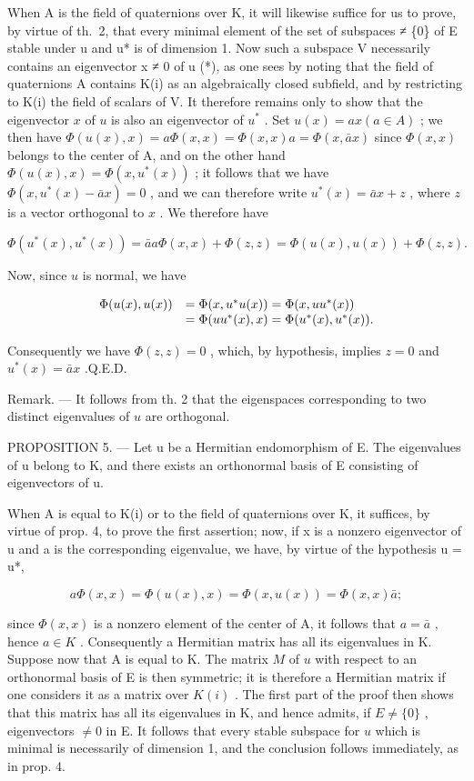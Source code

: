 When A is the field of quaternions over K, it will likewise suffice for us to prove, by virtue of th.~2, that every minimal element of the set of subspaces ≠ \{0\} of E stable under u and u* is of dimension 1. Now such a subspace V necessarily contains an eigenvector x ≠ 0 of u (*), as one sees by noting that the field of quaternions A contains K(i) as an algebraically closed subfield, and by restricting to K(i) the field of scalars of V. It therefore remains only to show that the eigenvector \(x\) of \(u\) is also an eigenvector of \(u^{*}\) . Set \(u(x) = ax (a \in A)\) ; we then have \(\Phi(u(x), x) = a\Phi(x, x) = \Phi(x, x)a = \Phi(x, \bar{a}x)\) since \(\Phi(x, x)\) belongs to the center of A, and on the other hand \(\Phi(u(x), x) = \Phi(x, u^*(x))\) ; it follows that we have \(\Phi(x, u^*(x) - \bar{a}x) = 0\) , and we can therefore write \(u^*(x) = \bar{a}x + z\) , where \(z\) is a vector orthogonal to \(x\) . We therefore have

\[
\Phi (u ^ {*} (x), u ^ {*} (x)) = \bar {a} a \Phi (x, x) + \Phi (z, z) = \Phi (u (x), u (x)) + \Phi (z, z).
\]

Now, since \(u\) is normal, we have

\[
\begin{array}{r l} \Phi (u (x), u (x)) & = \Phi (x, u ^ {*} u (x)) = \Phi (x, u u ^ {*} (x)) \\ & = \Phi (u u ^ {*} (x), x) = \Phi (u ^ {*} (x), u ^ {*} (x)). \end{array}
\]

Consequently we have \(\Phi(z, z) = 0\) , which, by hypothesis, implies \(z = 0\) and \(u^{*}(x) = \bar{a}x\) .Q.E.D.

Remark. --- It follows from th. 2 that the eigenspaces corresponding to two distinct eigenvalues of \(u\) are orthogonal.

PROPOSITION 5. --- Let u be a Hermitian endomorphism of E. The eigenvalues of u belong to K, and there exists an orthonormal basis of E consisting of eigenvectors of u.

When A is equal to K(i) or to the field of quaternions over K, it suffices, by virtue of prop. 4, to prove the first assertion; now, if x is a nonzero eigenvector of u and a is the corresponding eigenvalue, we have, by virtue of the hypothesis u = u*,

\[
a \Phi (x, x) = \Phi (u (x), x) = \Phi (x, u (x)) = \Phi (x, x) \bar {a};
\]

since \(\Phi(x, x)\) is a nonzero element of the center of A, it follows that \(a = \bar{a}\) , hence \(a \in K\) . Consequently a Hermitian matrix has all its eigenvalues in K. Suppose now that A is equal to K. The matrix \(M\) of \(u\) with respect to an orthonormal basis of E is then symmetric; it is therefore a Hermitian matrix if one considers it as a matrix over \(K(i)\) . The first part of the proof then shows that this matrix has all its eigenvalues in K, and hence admits, if \(E \neq \{0\}\) , eigenvectors \(\neq 0\) in E. It follows that every stable subspace for \(u\) which is minimal is necessarily of dimension 1, and the conclusion follows immediately, as in prop. 4.

